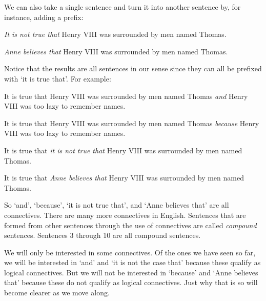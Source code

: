 We can also take a single sentence and turn it into another sentence by, for 
instance, adding a prefix:

\begin{slist}
\item \emph{It is not true that} Henry VIII was surrounded by men named Thomas.

\item \emph{Anne believes that} Henry VIII was surrounded by men named Thomas.
\end{slist}

Notice that the results are all sentences in our sense since they can all be 
prefixed with `it is true that'. For example:

\begin{slist}

\item It is true that Henry VIII was surrounded by men named Thomas \emph{and} 
 Henry VIII was too lazy to remember names.

\item It is true that Henry VIII was surrounded by men named Thomas 
 \emph{because} Henry VIII was too lazy to remember names.

\item It is true that \emph{it is not true that} Henry VIII was surrounded by 
 men named Thomas.

\item It is true that \emph{Anne believes that} Henry VIII was surrounded by men 
 named Thomas.

\end{slist}

So `and', `because', `it is not true that', and `Anne believes that' are all 
connectives. There are many more connectives in English. Sentences that are 
formed from other sentences through the use of connectives are called 
\emph{compound} sentences. Sentences 3 through 10 are all compound sentences. 

We will only be interested in some connectives. Of the ones we have seen so far, 
we will be interested in `and' and `it is not the case that' because these  
qualify as logical connectives. But we will not be interested in `because' and 
`Anne believes that' because these do not qualify as logical connectives. Just 
why that is so will become clearer as we move along. 

